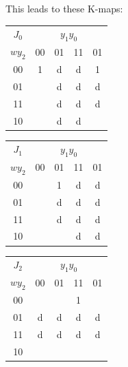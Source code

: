 \documentclass[10pt,a4paper]{scrartcl}
\begin{document}
This leads to these K-maps:\\
\begin{tabular}{|c||c|c|c|c|}
  \hline
 $J_0$   & \multicolumn{4}{c|}{$y_1y_0$} \\
  $wy_2$ & 00                 & 01                 & 11                 & 01                 \\ \hline\hline
  00     & \cellcolor{gray}1  & \cellcolor{gray}d  & \cellcolor{gray}d  & \cellcolor{gray}1  \\ \hline
  01     &                    & d                  & d                  & d                  \\ \hline
  11     &                    & d                  & d                  & d                  \\ \hline
  10     &                    & d                  & d                  &                    \\ \hline
\end{tabular}
\begin{tabular}{|c||c|c|c|c|}
  \hline
 $J_1$   & \multicolumn{4}{c|}{$y_1y_0$} \\
  $wy_2$ & 00                 & 01                 & 11                 & 01                 \\ \hline\hline
  00     &                    & \cellcolor{gray}1  & \cellcolor{gray}d  & d                  \\ \hline
  01     &                    & \cellcolor{gray}d  & \cellcolor{gray}d  & d                  \\ \hline
  11     &                    & d                  & d                  & d                  \\ \hline
  10     &                    &                    & d                  & d                  \\ \hline
\end{tabular}
\begin{tabular}{|c||c|c|c|c|}
  \hline
 $J_2$   & \multicolumn{4}{c|}{$y_1y_0$} \\
  $wy_2$ & 00                 & 01                 & 11                 & 01                 \\ \hline\hline
  00     &                    &                    & \cellcolor{gray}1  &                    \\ \hline
  01     & d                  & d                  & \cellcolor{gray}d  & d                  \\ \hline
  11     & d                  & d                  & d                  & d                  \\ \hline
  10     &                    &                    &                    &                    \\ \hline
\end{tabular}
\end{document}
